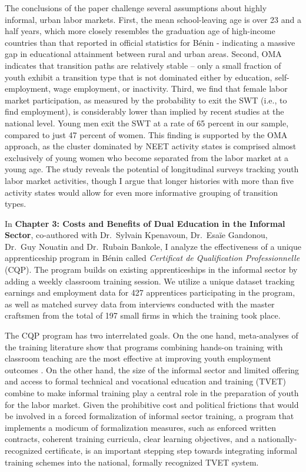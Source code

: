 \documentclass[
  a4paper, twoside, 12pt]{book}
\begin{document}
The conclusions of the paper challenge several assumptions about highly informal, urban labor markets. First, the mean school-leaving age is over 23 and a half years, which more closely resembles the graduation age of high-income countries than that reported in official statistics for Bénin - indicating a massive gap in educational attainment between rural and urban areas. Second, OMA indicates that transition paths are relatively stable -- only a small fraction of youth exhibit a transition type that is not dominated either by education, self-employment, wage employment, or inactivity. Third, we find that female labor market participation, as measured by the probability to exit the SWT (i.e., to find employment), is considerably lower than implied by recent studies at the national level. Young men exit the SWT at a rate of 65 percent in our sample, compared to just 47 percent of women. This finding is supported by the OMA approach, as the cluster dominated by NEET activity states is comprised almost exclusively of young women who become separated from the labor market at a young age. The study reveals the potential of longitudinal surveys tracking youth labor market activities, though I argue that longer histories with more than five activity states would allow for even more informative grouping of transition types.

In \textbf{Chapter 3: Costs and Benefits of Dual Education in the Informal Sector}, co-authored with Dr.~Sylvain Kpenavoun, Dr.~Esaïe Gandonou, Dr.~Guy Nouatin and Dr.~Rubain Bankole, I analyze the effectiveness of a unique apprenticeship program in Bénin called \emph{Certificat de Qualification Professionnelle} (CQP). The program builds on existing apprenticeships in the informal sector by adding a weekly classroom training session. We utilize a unique dataset tracking earnings and employment data for 427 apprentices participating in the program, as well as matched survey data from interviews conducted with the master craftsmen from the total of 197 small firms in which the training took place.

The CQP program has two interrelated goals. On the one hand, meta-analyses of the training literature show that programs combining hands-on training with classroom teaching are the most effective at improving youth employment outcomes \autocite{kluve2019,ghisletta2021}. On the other hand, the size of the informal sector and limited offering and access to formal technical and vocational education and training (TVET) combine to make informal training play a central role in the preparation of youth for the labor market. Given the prohibitive cost and political frictions that would be involved in a forced formalization of informal sector training, a program that implements a modicum of formalization measures, such as enforced written contracts, coherent training curricula, clear learning objectives, and a nationally-recognized certificate, is an important stepping step towards integrating informal training schemes into the national, formally recognized TVET system.
\end{document}
